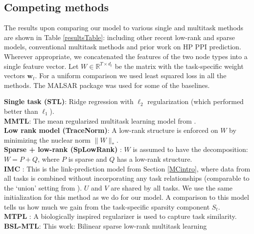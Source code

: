 \documentclass[runningheads,a4paper]{llncs}
\begin{document}
\subsection{Competing methods}
The results upon comparing our model to various single and multitask methods are shown in Table \ref{resultsTable}: including other recent low-rank and sparse models, conventional multitask methods and prior work on HP PPI prediction. Wherever appropriate, we concatenated the features of the two node types into a single feature vector. Let $W \in \mathbb{R}^{T \times d_t}$ be the matrix with the task-specific weight vectors $\mathbf{w}_t$. For a uniform comparison we used least squared loss in all the methods. The MALSAR package was used for some of the baselines. 
 
\noindent\textbf{Single task (STL)}: Ridge regression with $\ell_2$ regularization (which performed better than $\ell_1$). \\
\noindent\textbf{MMTL}: The mean regularized multitask learning model from \cite{pontil04}. \\
\noindent\textbf{Low rank model (TraceNorm)}: A low-rank structure is enforced on $W$ by minimizing the nuclear norm $\|W\|_*$. \\
\noindent\textbf{Sparse + low-rank (SpLowRank)} \cite{chen2012}: $W$ is assumed to have the decomposition: $W = P + Q$, where $P$ is sparse and $Q$ has a low-rank structure. \\
\noindent\textbf{IMC} \cite{prateek,nagarajan}: This is the link-prediction model from Section \ref{MCintro}, where data from all tasks is combined without incorporating any task relationships (comparable to the `union' setting from \cite{widmer}). $U$ and $V$ are shared by all tasks. We use the same initialization for this method as we do for our model. A comparison to this model tells us how much we gain from the task-specific sparsity component $S_t$. \\
\noindent\textbf{MTPL} \cite{me_ismb_2013}: A biologically inspired regularizer is used to capture task similarity.\\ \noindent\textbf{BSL-MTL}: This work: Bilinear sparse low-rank multitask learning
\end{document}
